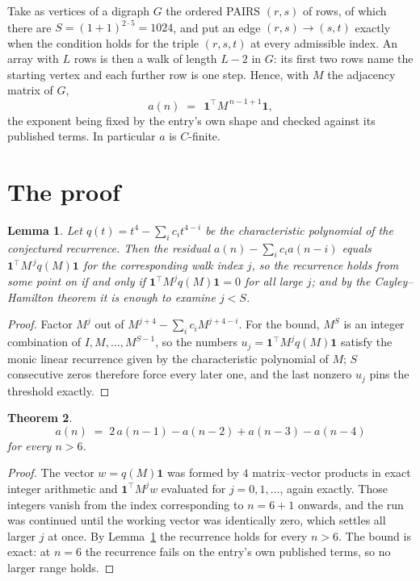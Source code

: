 \documentclass[11pt,a4paper]{article}
\theoremstyle{plain}
\newtheorem{theorem}{Theorem}
\newtheorem{lemma}[theorem]{Lemma}
\theoremstyle{definition}
\begin{document}
Take as vertices of a digraph $G$ the ordered PAIRS $(r,s)$ of rows, of which there are
$S=(1+1)^{2\cdot5}=1024$, and put an edge $(r,s)\to(s,t)$ exactly when the condition
holds for the triple $(r,s,t)$ at every admissible index. An array with $L$ rows is then a
walk of length $L-2$ in $G$: its first two rows name the starting vertex and each further
row is one step. Hence, with $M$ the adjacency matrix of $G$,
\[
a(n)\;=\;\,\mathbf{1}^{\!\top}M^{\,n-1+1}\mathbf{1},
\]
the exponent being fixed by the entry's own shape and checked against its published terms.
In particular $a$ is $C$-finite.

\section{The proof}

\begin{lemma}\label{lem:crit}
Let $q(t)=t^{4}-\sum_i c_it^{4-i}$ be the characteristic polynomial of the
conjectured recurrence. Then the residual $a(n)-\sum_ic_ia(n-i)$ equals
$\mathbf{1}^{\!\top}M^{\,j}q(M)\mathbf{1}$ for the corresponding walk index
$j$, so the recurrence holds from some point on if and only if
$\mathbf{1}^{\!\top}M^{j}q(M)\mathbf{1}=0$ for all large $j$; and by the
Cayley--Hamilton theorem it is enough to examine $j<S$.
\end{lemma}

\begin{proof}
Factor $M^{j}$ out of $M^{j+4}-\sum_ic_iM^{j+4-i}$. For the bound, $M^{S}$
is an integer combination of $I,M,\dots,M^{S-1}$, so the numbers
$u_j=\mathbf{1}^{\!\top}M^{j}q(M)\mathbf{1}$ satisfy the monic linear recurrence given by
the characteristic polynomial of $M$; $S$ consecutive zeros therefore force every later one,
and the last nonzero $u_j$ pins the threshold exactly.
\end{proof}

\begin{theorem}
\[
a(n)\;=\;2\,a(n-1) - a(n-2) + a(n-3) - a(n-4)
\]
for every $n>6$.
\end{theorem}

\begin{proof}
The vector $w=q(M)\mathbf{1}$ was formed by $4$ matrix--vector products in exact
integer arithmetic and $\mathbf{1}^{\!\top}M^{j}w$ evaluated for $j=0,1,\dots$, again
exactly. Those integers vanish from the index corresponding to $n=6+1$ onwards, and the
run was continued until the working vector was identically zero, which settles all larger $j$
at once. By Lemma~\ref{lem:crit} the recurrence holds for every $n>6$. The bound is exact: at $n=6$ the recurrence fails on the entry's own published terms, so no larger range holds.
\end{proof}
\end{document}
